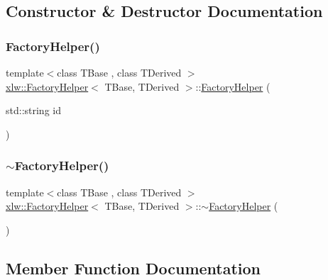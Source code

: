 \subsection{Constructor \& Destructor Documentation}
\hypertarget{classxlw_1_1FactoryHelper_a44de841ec0fc63247dbf75810ada63ba}{}\label{classxlw_1_1FactoryHelper_a44de841ec0fc63247dbf75810ada63ba} 
\subsubsection{\texorpdfstring{Factory\+Helper()}{FactoryHelper()}}
{\footnotesize\ttfamily template$<$class T\+Base , class T\+Derived $>$ \\
\hyperlink{classxlw_1_1FactoryHelper}{xlw\+::\+Factory\+Helper}$<$ T\+Base, T\+Derived $>$\+::\hyperlink{classxlw_1_1FactoryHelper}{Factory\+Helper} (\begin{DoxyParamCaption}\item[{std\+::string}]{id }\end{DoxyParamCaption})}

\hypertarget{classxlw_1_1FactoryHelper_afc7bf132e7c347c5f606b7ba4d7c7131}{}\label{classxlw_1_1FactoryHelper_afc7bf132e7c347c5f606b7ba4d7c7131} 
\subsubsection{\texorpdfstring{$\sim$\+Factory\+Helper()}{~FactoryHelper()}}
{\footnotesize\ttfamily template$<$class T\+Base , class T\+Derived $>$ \\
\hyperlink{classxlw_1_1FactoryHelper}{xlw\+::\+Factory\+Helper}$<$ T\+Base, T\+Derived $>$\+::$\sim$\hyperlink{classxlw_1_1FactoryHelper}{Factory\+Helper} (\begin{DoxyParamCaption}{ }\end{DoxyParamCaption})\hspace{0.3cm}{\ttfamily [inline]}}



\subsection{Member Function Documentation}
\hypertarget{classxlw_1_1FactoryHelper_a5505b444732c858b81701508dec1dbbf}{}\label{classxlw_1_1FactoryHelper_a5505b444732c858b81701508dec1dbbf} 
